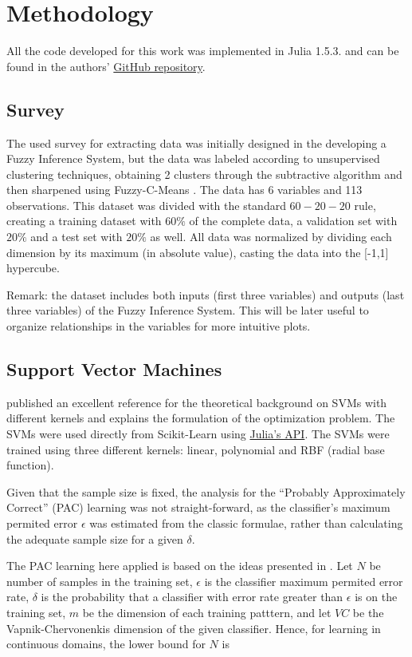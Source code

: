 \documentclass[conference]{IEEEtran}
\theoremstyle{definition}
\theoremstyle{remark}
\theoremstyle{remark}
\begin{document}
\section{Methodology}\label{sec:meth}
All the code developed for this work was implemented in Julia 1.5.3. and
can be found in the authors'
\href{https://github.com/juanscr/ai-works}{GitHub repository}.

\subsection{Survey}
The used survey for extracting data was initially designed in the developing
a Fuzzy Inference System, but the data was labeled according to
unsupervised clustering techniques, obtaining 2 clusters through the subtractive
algorithm \parencite{chiu1994} and then sharpened using Fuzzy-C-Means
\parencite{dunn1973}. The data has 6 variables and 113 observations. This
dataset was divided with the standard $60-20-20$ rule, creating a training
dataset with $60\%$ of the complete data, a validation set with $20\%$ and a
test set with $20\%$ as well. All data was normalized by dividing each dimension
by its maximum (in absolute value), casting the data into the [-1,1] hypercube.

Remark: the dataset includes both inputs (first three variables) and outputs
(last three variables) of the Fuzzy Inference System. This will be later
useful to organize relationships in the variables for more intuitive plots.

\subsection{Support Vector Machines}
\textcite{burges1998} published an excellent reference for the theoretical
background on SVMs with different kernels and explains the formulation of the
optimization problem. The SVMs were used directly from Scikit-Learn
\parencite{scikit-learn, sklearn_api} using
\href{https://bit.ly/3lDHADX}{Julia's API}. The SVMs were trained using three
different kernels: linear, polynomial and RBF (radial base function).

Given that the sample size is fixed, the analysis for the ``Probably
Approximately Correct'' (PAC) learning was not straight-forward, as the
classifier's maximum permited error $\epsilon$ was estimated from the classic
formulae, rather than calculating the adequate sample size for a given $\delta$.

The PAC learning here applied is based on the ideas presented in
\parencite{kubat2017}. Let $N$ be number of samples in the training set,
$\epsilon$ is the classifier maximum permited error rate, $\delta$ is the
probability that a classifier with error rate greater than $\epsilon$ is
 on the training set, $m$ be the dimension of each training
patttern, and let $VC$ be the Vapnik-Chervonenkis dimension of the given
classifier. Hence, for learning in continuous domains, the lower bound for
$N$ is
\end{document}

